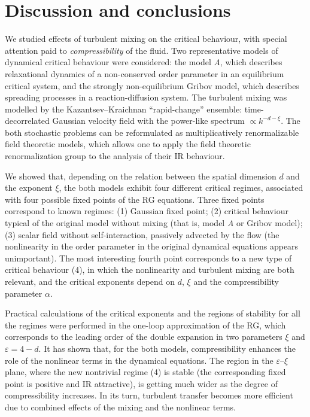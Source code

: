 \documentclass[12pt]{article}
\begin{document}
\section{Discussion and conclusions} \label{sec:Conc}


We studied effects of turbulent mixing on the critical behaviour, with
special attention paid to {\it compressibility} of the fluid. Two
representative models of dynamical critical behaviour were considered:
the model {\it A}, which describes relaxational dynamics of a non-conserved
order parameter in an equilibrium critical system, and the strongly
non-equilibrium Gribov model, which describes spreading processes in
a reaction-diffusion system. The turbulent mixing was modelled by the
Kazantsev--Kraichnan ``rapid-change'' ensemble: time-decorrelated Gaussian
velocity field with the power-like spectrum $\propto k^{-d-\xi}$.
The both stochastic problems can be reformulated as multiplicatively
renormalizable field theoretic models, which allows one to apply the field
theoretic renormalization group to the analysis of their IR behaviour.

We showed that, depending on the relation between the spatial dimension
$d$ and the exponent $\xi$, the both models exhibit four different critical
regimes, associated with four possible fixed points of the RG equations.
Three fixed points correspond to known regimes: (1) Gaussian fixed point;
(2) critical behaviour typical of the original model without mixing (that is,
model {\it A} or Gribov model); (3) scalar field without self-interaction,
passively advected by the flow (the nonlinearity in the order parameter in
the original dynamical equations appears unimportant). The most interesting
fourth point corresponds to a new type of critical behaviour (4), in which
the nonlinearity and turbulent mixing are both relevant, and the critical
exponents depend on $d$, $\xi$ and the compressibility parameter $\alpha$.

Practical calculations of the critical exponents and the regions of
stability for all the regimes were performed in the one-loop approximation
of the RG, which corresponds to the leading order of the double expansion
in two parameters $\xi$ and $\varepsilon=4-d$. It has shown that, for the
both models, compressibility enhances the role of the nonlinear terms in
the dynamical equations. The region in the $\varepsilon$--$\xi$ plane,
where the new nontrivial regime (4) is stable (the corresponding fixed
point is positive and IR attractive), is getting much wider as the degree
of compressibility increases. In its turn, turbulent transfer becomes more
efficient due to combined effects of the mixing and the nonlinear terms.
\end{document}
